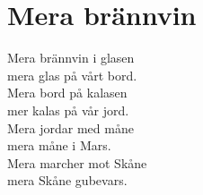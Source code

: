 \section{Mera brännvin}
Mera brännvin i glasen\\
mera glas på vårt bord.\\
Mera bord på kalasen\\
mer kalas på vår jord.\\

Mera jordar med måne\\
mera måne i Mars.\\
Mera marcher mot Skåne\\
mera Skåne gubevars.\\